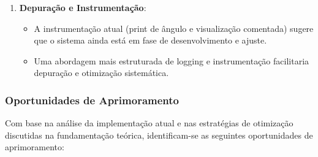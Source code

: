 \begin{enumerate}
    \item \textbf{Depuração e Instrumentação}:
          \begin{itemize}
              \item A instrumentação atual (print de ângulo e visualização comentada) sugere que o
                    sistema ainda está em fase de desenvolvimento e ajuste.
              \item Uma abordagem mais estruturada de logging e instrumentação facilitaria
                    depuração e otimização sistemática.
          \end{itemize}
\end{enumerate}

\subsubsection{Oportunidades de Aprimoramento}

Com base na análise da implementação atual e nas estratégias de otimização
discutidas na fundamentação teórica, identificam-se as seguintes oportunidades
de aprimoramento:


